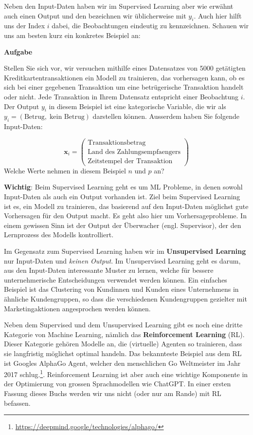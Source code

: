 \documentclass[
]{book}
\begin{document}
Neben den Input-Daten haben wir im Supervised Learning aber wie erwähnt auch einen Output und den bezeichnen wir üblicherweise mit \(y_i\). Auch hier hilft uns der Index \(i\) dabei, die Beobachtungen eindeutig zu kennzeichnen. Schauen wir uns am besten kurz ein konkretes Beispiel an:

\textbf{Aufgabe}

Stellen Sie sich vor, wir versuchen mithilfe eines Datensatzes von 5000 getätigten Kreditkartentransaktionen ein Modell zu trainieren, das vorhersagen kann, ob es sich bei einer gegebenen Transaktion um eine betrügerische Transaktion handelt oder nicht. Jede Transaktion in Ihrem Datensatz entspricht einer Beobachtung \(i\). Der Output \(y_i\) in diesem Beispiel ist eine kategorische Variable, die wir als \(y_i=(\text{Betrug},\;\text{kein Betrug})\) darstellen können. Ausserdem haben Sie folgende Input-Daten:

\[
\mathbf{x}_i=\begin{pmatrix} \text{Transaktionsbetrag} \\ \text{Land des Zahlungsempfaengers} \\ \text{Zeitstempel der Transaktion} \end{pmatrix}
\]
Welche Werte nehmen in diesem Beispiel \(n\) und \(p\) an?

\textbf{Wichtig}: Beim Supervised Learning geht es um ML Probleme, in denen sowohl Input-Daten als auch ein Output vorhanden ist. Ziel beim Supervised Learning ist es, ein Modell zu trainieren, das basierend auf den Input-Daten möglichst gute Vorhersagen für den Output macht. Es geht also hier um Vorhersageprobleme. In einem gewissen Sinn ist der Output der Überwacher (engl. Supervisor), der den Lernprozess des Modells kontrolliert.

Im Gegensatz zum Supervised Learning haben wir im \textbf{Unsupervised Learning} nur Input-Daten und \emph{keinen Output}. Im Unsupervised Learning geht es darum, aus den Input-Daten interessante Muster zu lernen, welche für bessere unternehmerische Entscheidungen verwendet werden können. Ein einfaches Beispiel ist das Clustering von Kundinnen und Kunden eines Unternehmens in ähnliche Kundengruppen, so dass die verschiedenen Kundengruppen gezielter mit Marketingaktionen angesprochen werden können.

Neben dem Supervised und dem Unsupervised Learning gibt es noch eine dritte Kategorie von Machine Learning, nämlich das \textbf{Reinforcement Learning} (RL). Dieser Kategorie gehören Modelle an, die (virtuelle) Agenten so trainieren, dass sie langfristig möglichst optimal handeln. Das bekannteste Beispiel aus dem RL ist Googles AlphaGo Agent, welcher den menschlichen Go Weltmeister im Jahr 2017 schlug.\footnote{\url{https://deepmind.google/technologies/alphago/}}. Reinforcement Learning ist aber auch eine wichtige Komponente in der Optimierung von grossen Sprachmodellen wie ChatGPT. In einer ersten Fassung dieses Buchs werden wir uns nicht (oder nur am Rande) mit RL befassen.
\end{document}
